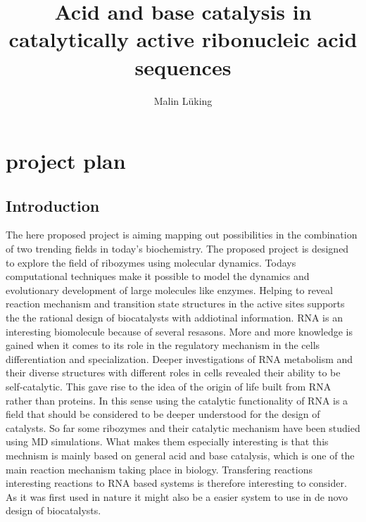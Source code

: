 \documentclass[12pt]{article}
\begin{document}
\begin{titlepage}
\title{Acid and base catalysis in catalytically active ribonucleic acid sequences}
\author{Malin L\"{u}king}

\end{titlepage}
\maketitle
  \newpage
   	
\begin{abstract}

\end{abstract}

\section{project plan}
\subsection{Introduction}
The here proposed project is aiming mapping out possibilities in the combination of two trending fields in today's biochemistry. The proposed project is designed to explore the field of ribozymes using molecular dynamics. Todays computational techniques make it possible to model the dynamics and evolutionary development of large molecules like enzymes. Helping to reveal reaction mechanism and transition state structures in the active sites supports the the rational design of biocatalysts with addiotinal information.
RNA is an interesting biomolecule because of several resasons. More and more knowledge is gained when it comes to its role in the regulatory mechanism in the cells differentiation and specialization. Deeper investigations of RNA metabolism and their diverse structures with different roles in cells revealed their ability to be self-catalytic. This gave rise to the idea of the origin of life built from RNA rather than proteins. In this sense using the catalytic functionality of RNA is a field that should be considered to be deeper understood for the design of catalysts.
So far some ribozymes and their catalytic mechanism have been studied using MD simulations. What makes them especially interesting is that this mechnism is mainly based on general acid and base catalysis, which is one of the main reaction mechanism taking place in biology. Transfering reactions interesting reactions to RNA based systems is therefore interesting to consider. As it was first used in nature it might also be a easier system to use in de novo design of biocatalysts. 
\end{document}
